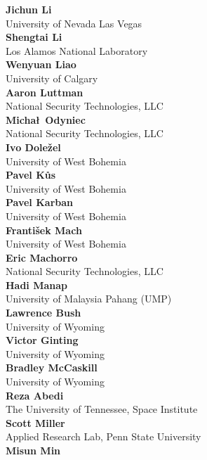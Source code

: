 \documentclass[article,A4,11pt]{llncs}%
\begin{document}
        \noindent
    {\bf Jichun Li}\\
    University of Nevada Las Vegas\\
        \noindent
    {\bf Shengtai Li}\\
    Los Alamos National Laboratory\\
        \noindent
    {\bf Wenyuan Liao}\\
    University of Calgary\\
        \noindent
    {\bf Aaron Luttman}\\
    National Security Technologies, LLC\\
        \noindent
    {\bf Micha\l\, Odyniec}\\
    National Security Technologies, LLC\\
        \noindent
    {\bf Ivo Dole\v{z}el}\\
    University of West Bohemia\\
        \noindent
    {\bf Pavel K\r{u}s}\\
    University of West Bohemia\\
        \noindent
    {\bf Pavel Karban}\\
    University of West Bohemia\\
        \noindent
    {\bf Franti\v{s}ek Mach}\\
    University of West Bohemia\\
        \noindent
    {\bf Eric Machorro}\\
    National Security Technologies, LLC\\
        \noindent
    {\bf Hadi Manap}\\
    University of Malaysia Pahang (UMP)\\
        \noindent
    {\bf Lawrence Bush}\\
    University of Wyoming\\
        \noindent
    {\bf Victor Ginting}\\
    University of Wyoming\\
        \noindent
    {\bf Bradley McCaskill}\\
    University of Wyoming\\
        \noindent
    {\bf Reza Abedi}\\
    The University of Tennessee, Space Institute\\
        \noindent
    {\bf Scott Miller}\\
    Applied Research Lab, Penn State University\\
        \noindent
    {\bf Misun Min}\\
\end{document}
